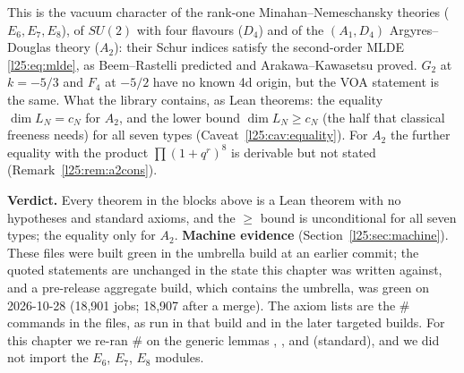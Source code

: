 \begin{physics}
This is the vacuum character of the rank-one Minahan--Nemeschansky theories ($E_6,E_7,E_8$), of $SU(2)$ with four
flavours ($D_4$) and of the $(A_1,D_4)$ Argyres--Douglas theory ($A_2$): their Schur indices satisfy the second-order
MLDE \eqref{l25:eq:mlde}, as Beem--Rastelli predicted and Arakawa--Kawasetsu proved. $G_2$ at $k=-5/3$ and $F_4$ at
$-5/2$ have no known 4d origin, but the VOA statement is the same. What the library contains, as Lean theorems: the
equality $\dim L_N=c_N$ for $A_2$, and the lower bound $\dim L_N\ge c_N$ (the half that classical freeness needs) for
all seven types (Caveat~\ref{l25:cav:equality}). For $A_2$ the further equality with the product $\prod(1+q^r)^8$ is
derivable but not stated (Remark~\ref{l25:rem:a2cons}).
\end{physics}
\begin{status}
\textbf{Verdict.} Every theorem in the blocks above is a Lean theorem with no hypotheses and standard axioms, and the
$\ge$ bound is unconditional for all seven types; the equality only for $A_2$. \textbf{Machine evidence}
(Section~\ref{l25:sec:machine}). These files were built green in the  umbrella build at
an earlier commit; the quoted statements are unchanged in the state this chapter was written against, and a pre-release aggregate build, which contains the umbrella,
was green on 2026-10-28 (18{,}901 jobs; 18{,}907 after a merge). The axiom lists are the \# commands in the files, as run in that build
and in the later targeted builds. For this chapter we re-ran \# on the generic lemmas
, ,
 and  (standard), and we did not
import the $E_6$, $E_7$, $E_8$ modules.
\end{status}

